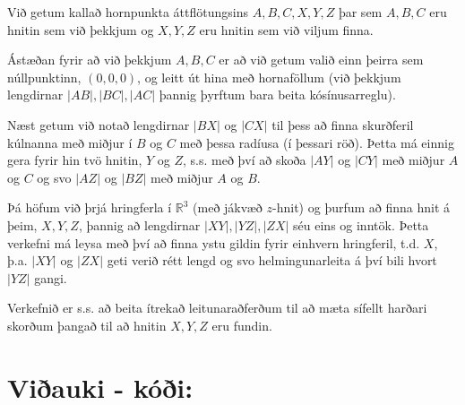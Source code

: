 \documentclass{article}
\begin{document}
Við getum kallað hornpunkta áttflötungsins $A,B,C,X,Y,Z$ þar sem $A,B,C$ eru
hnitin sem við þekkjum og $X,Y,Z$ eru hnitin sem við viljum finna.

Ástæðan fyrir að við þekkjum $A,B,C$ er að við getum valið einn þeirra sem
núllpunktinn, $(0,0,0)$, og leitt út hina með hornaföllum (við þekkjum
lengdirnar $|AB|, |BC|, |AC|$ þannig þyrftum bara beita kósínusarreglu).

Næst getum við notað lengdirnar $|BX|$ og $|CX|$ til þess að finna skurðferil
kúlnanna með miðjur í $B$ og $C$ með þessa radíusa (í þessari röð). Þetta má einnig gera
fyrir hin tvö hnitin, $Y$ og $Z$, s.s. með því að skoða $|AY|$ og $|CY|$ með
miðjur $A$ og $C$ og svo $|AZ|$ og $|BZ|$ með miðjur $A$ og $B$.

Þá höfum við þrjá hringferla í $\mathbb{R}^3$ (með jákvæð $z$-hnit) og þurfum að
finna hnit á þeim, $X,Y,Z$, þannig að lengdirnar $|XY|, |YZ|, |ZX|$ séu eins og
inntök. Þetta verkefni má leysa með því að finna ystu gildin fyrir einhvern
hringferil, t.d. $X$, þ.a. $|XY|$ og $|ZX|$ geti verið rétt lengd og svo
helmingunarleita á því bili hvort $|YZ|$ gangi.

Verkefnið er s.s. að beita ítrekað leitunaraðferðum til að mæta sífellt harðari
skorðum þangað til að hnitin $X,Y,Z$ eru fundin.

\section*{Viðauki - kóði:}
\end{document}
